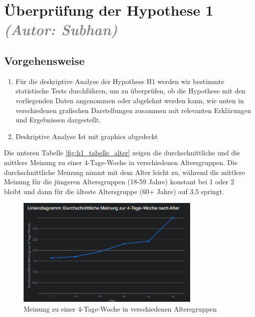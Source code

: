 \chapter{Überprüfung der Hypothese 1 \textit{\textcolor{gray}{(Autor: Subhan)}}}
\label{chap:hypothese1}

\section{Vorgehensweise}

\begin{enumerate}
    \item Für die deskriptive Analyse der Hypothese H1 werden wir bestimmte statistische Tests 
    durchführen, um zu überprüfen, ob die Hypothese mit den vorliegenden Daten angenommen oder 
    abgelehnt werden kann, wie unten in verschiedenen grafischen Darstellungen zusammen mit 
    relevanten Erklärungen und Ergebnissen dargestellt.
    \item Deskriptive Analyse Ist mit graphics abgedeckt
\end{enumerate}

Die unteren Tabelle \ref*{fig:h1_tabelle_alter} zeigen die durchschnittliche und die mittlere Meinung zu einer 4-Tage-Woche 
in verschiedenen Altersgruppen. Die durchschnittliche Meinung nimmt mit dem Alter leicht zu, 
während die mittlere Meinung für die jüngeren Altersgruppen (18-59 Jahre) konstant bei 1 oder 2 
bleibt und dann für die älteste Altersgruppe (60+ Jahre) auf 3,5 springt.

\begin{figure}[h]
    \centering
    \includegraphics[width=0.8\textwidth]{04_Artefakte/01_Abbildungen/hypothese_1/h1_linie_alter.png}
     \caption{Meinung zu einer 4-Tage-Woche in verschiedenen Altersgruppen}
     \label{fig:h1_linie_alter}
\end{figure}

